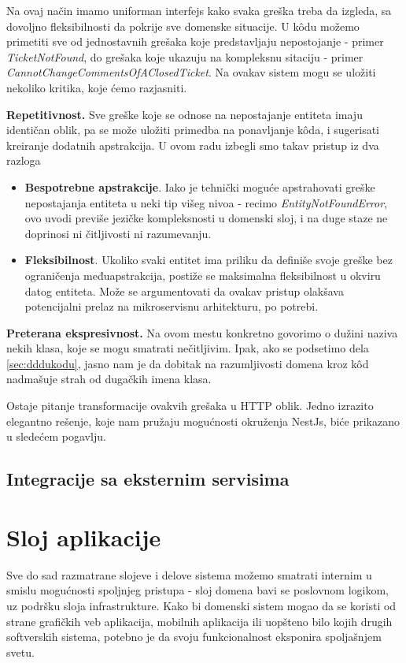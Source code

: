 \documentclass[12pt,oneside]{memoir}
\begin{document}
Na ovaj način imamo uniforman interfejs kako svaka greška treba da izgleda, sa dovoljno fleksibilnosti da pokrije sve domenske situacije. U k\^{o}du možemo primetiti sve od jednostavnih grešaka koje predstavljaju nepostojanje - primer \textit{TicketNotFound}, do grešaka koje ukazuju na kompleksnu sitaciju - primer \textit{CannotChangeCommentsOfAClosedTicket}. Na ovakav sistem mogu se uložiti nekoliko kritika, koje ćemo razjasniti.

\textbf{Repetitivnost.}  
Sve greške koje se odnose na nepostajanje entiteta imaju identičan oblik, pa se može uložiti primedba na ponavljanje k\^{o}da, i sugerisati kreiranje dodatnih apstrakcija. U ovom radu izbegli smo takav pristup iz dva razloga
\begin{itemize}
    \item \textbf{Bespotrebne apstrakcije}. Iako je tehnički moguće apstrahovati greške nepostajanja entiteta u neki tip višeg nivoa - recimo \textit{EntityNotFoundError}, ovo uvodi previše jezičke kompleksnosti u domenski sloj, i na duge staze ne doprinosi ni čitljivosti ni razumevanju.
    \item \textbf{Fleksibilnost}. Ukoliko svaki entitet ima priliku da definiše svoje greške bez ograničenja međuapstrakcija, postiže se maksimalna fleksibilnost u okviru datog entiteta. Može se argumentovati da ovakav pristup olakšava potencijalni prelaz na mikroservisnu arhitekturu, po potrebi.
\end{itemize}
\textbf{Preterana ekspresivnost.} Na ovom mestu konkretno govorimo o dužini naziva nekih klasa, koje se mogu smatrati nečitljivim. Ipak, ako se podsetimo dela \ref{sec:dddukodu}, jasno nam je da dobitak na razumljivosti domena kroz k\^{o}d nadmašuje strah od dugačkih imena klasa.

Ostaje pitanje transformacije ovakvih grešaka u HTTP oblik. Jedno izrazito elegantno rešenje, koje nam pružaju mogućnosti okruženja NestJs, biće prikazano u sledećem pogavlju.

\subsection{Integracije sa eksternim servisima}

\section{Sloj aplikacije}

Sve do sad razmatrane slojeve i delove sistema možemo smatrati internim u smislu mogućnosti spoljnjeg pristupa - sloj domena bavi se poslovnom logikom, uz podršku sloja infrastrukture. Kako bi domenski sistem mogao da se koristi od strane grafičkih veb aplikacija, mobilnih aplikacija ili uopšteno bilo kojih drugih softverskih sistema, potebno je da svoju funkcionalnost eksponira spoljašnjem svetu. 
\end{document}
